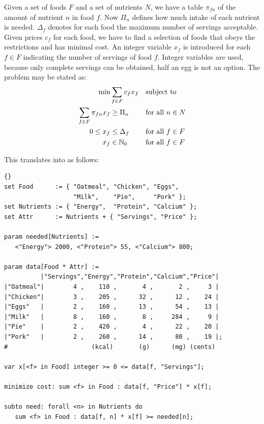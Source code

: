 Given a set of foods $F$ and a set of nutrients $N$, we have a table
$\pi_{fn}$ of the amount of nutrient $n$ in food $f$. Now $\Pi_n$
defines how much intake of each nutrient is needed. $\Delta_f$
denotes for each food the maximum number of servings acceptable.
Given prices $c_f$ for each food, we have to find a selection of foods
that obeys the restrictions and has minimal cost. An integer
variable $x_f$ is introduced for each $f\in F$ indicating the number of servings of
food $f$. Integer variables are used, because only complete servings can be
obtained, \ie half an egg is not an option.
The problem may be stated as:
\begin{align*}
\min&\sum_{f\in F}c_{f} x_{f}&&\mbox{subject to}\nonumber\\
\sum_{f\in F} \pi_{fn} x_{f}&\ge\Pi_n&&\text{for all } n\in N\nonumber\\
0\leq x_{f}&\leq\Delta_f&&\text{for all } f\in F\nonumber\\
x_{f}&\in\mathbb{N}_0&&\text{for all } f\in F
\end{align*}

\noindent This translates into \zimpl as follows:

\medskip
{}
\begin{lstlisting}[frame=tb]{}
set Food      := { "Oatmeal", "Chicken", "Eggs",
                   "Milk",    "Pie",     "Pork" };
set Nutrients := { "Energy",  "Protein", "Calcium" };
set Attr      := Nutrients + { "Servings", "Price" };

param needed[Nutrients] :=
   <"Energy"> 2000, <"Protein"> 55, <"Calcium"> 800;

param data[Food * Attr] :=
          |"Servings","Energy","Protein","Calcium","Price"|
|"Oatmeal"|        4 ,    110 ,       4 ,       2 ,     3 |
|"Chicken"|        3 ,    205 ,      32 ,      12 ,    24 |
|"Eggs"   |        2 ,    160 ,      13 ,      54 ,    13 |
|"Milk"   |        8 ,    160 ,       8 ,     284 ,     9 |
|"Pie"    |        2 ,    420 ,       4 ,      22 ,    20 |
|"Pork"   |        2 ,    260 ,      14 ,      80 ,    19 |;
#                       (kcal)       (g)      (mg) (cents)

var x[<f> in Food] integer >= 0 <= data[f, "Servings"];

minimize cost: sum <f> in Food : data[f, "Price"] * x[f];

subto need: forall <n> in Nutrients do
   sum <f> in Food : data[f, n] * x[f] >= needed[n];
\end{lstlisting}

